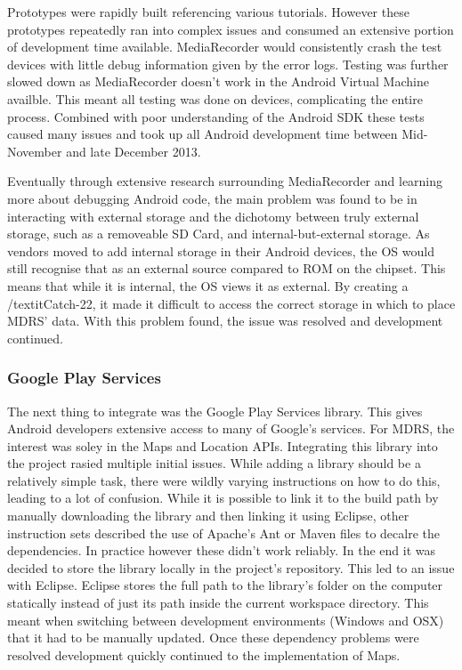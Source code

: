 \documentclass{l3proj}
\begin{document}
Prototypes were rapidly built referencing various tutorials. However these
prototypes repeatedly ran into complex issues and consumed an extensive portion
of development time available. MediaRecorder would consistently crash the test
devices with little debug information given by the error logs. Testing was
further slowed down as MediaRecorder doesn't work in the Android Virtual Machine
availble. This meant all testing was done on devices, complicating the entire
process. Combined with poor understanding of the Android SDK these tests caused
many issues and took up all Android development time between Mid-November and
late December 2013.

Eventually through extensive research surrounding MediaRecorder and learning
more about debugging Android code, the main problem was found to be in
interacting with external storage and the dichotomy between truly external
storage, such as a removeable SD Card, and internal-but-external storage. As
vendors moved to add internal storage in their Android devices, the OS would
still recognise that as an external source compared to ROM on the chipset. This
means that while it is internal, the OS views it as external. By creating a
/textit{Catch-22}, it made it difficult to access the correct storage in which
to place MDRS' data. With this problem found, the issue was resolved and
development continued.

\subsubsection{Google Play Services}    The next thing to integrate was the
Google Play Services library. This gives Android developers extensive access to
many of Google's services. For MDRS, the interest was soley in the Maps and Location APIs. Integrating this library into the project rasied multiple initial
issues. While adding a library should be a relatively simple task, there were
wildly varying instructions on how to do this, leading to a lot of confusion.
While it is possible to link it to the build path by manually downloading the
library and then linking it using Eclipse, other instruction sets described the
use of Apache's Ant or Maven files to decalre the dependencies. In practice
however these didn't work reliably. In the end it was decided to store the
library locally in the project's repository. This led to an issue with Eclipse.
Eclipse stores the full path to the library's folder on the computer statically
instead of just its path inside the current workspace directory. This meant when
switching between development environments (Windows and OSX) that it had to be
manually updated. Once these dependency problems were resolved development
quickly continued to the implementation of Maps.
\end{document}
